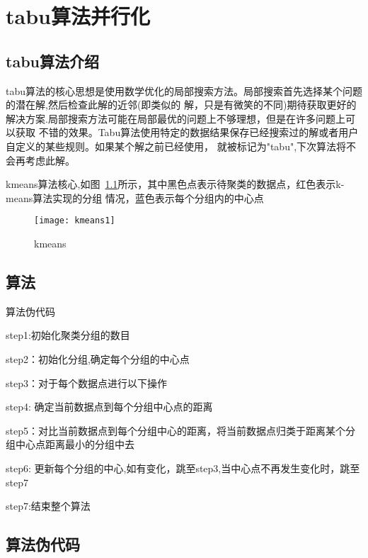 
\chapter[tabu算法并行化]{tabu算法并行化}
\section{tabu算法介绍}
tabu算法的核心思想是使用数学优化的局部搜索方法。局部搜索首先选择某个问题的潜在解,然后检查此解的近邻(即类似的
解，只是有微笑的不同)期待获取更好的解决方案.局部搜索方法可能在局部最优的问题上不够理想，但是在许多问题上可以获取
不错的效果。Tabu算法使用特定的数据结果保存已经搜索过的解或者用户自定义的某些规则。如果某个解之前已经使用，
就被标记为"tabu",下次算法将不会再考虑此解。

   kmeans算法核心,如图~\ref{fig:kmeans1}所示，其中黑色点表示待聚类的数据点，红色表示k-means算法实现的分组
情况，蓝色表示每个分组内的中心点

    \begin{figure}[htbp]
    \centering
    \texttt{[image: kmeans1]}
    \caption{kmeans}\label{fig:kmeans1}
    \vspace{\baselineskip}
    \end{figure}

\section{算法}

    算法伪代码  

    step1:初始化聚类分组的数目

    step2：初始化分组,确定每个分组的中心点

    step3：对于每个数据点进行以下操作

            step4: 确定当前数据点到每个分组中心点的距离

            step5：对比当前数据点到每个分组中心的距离，将当前数据点归类于距离某个分组中心点距离最小的分组中去

            step6: 更新每个分组的中心,如有变化，跳至step3,当中心点不再发生变化时，跳至step7

    step7:结束整个算法      
            
\section{算法伪代码}

